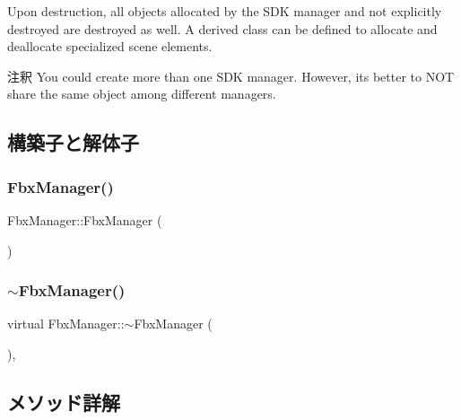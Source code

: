 Upon destruction, all objects allocated by the S\+DK manager and not explicitly destroyed are destroyed as well. A derived class can be defined to allocate and deallocate specialized scene elements. \begin{DoxyRemark}{注釈}
You could create more than one S\+DK manager. However, it\textquotesingle{}s better to N\+OT share the same object among different managers. 
\end{DoxyRemark}


\subsection{構築子と解体子}
\mbox{\label{class_fbx_manager_ab7b188ec0c92172140883e2be38e1a4a}} 
\subsubsection{\texorpdfstring{Fbx\+Manager()}{FbxManager()}}
{\footnotesize\ttfamily Fbx\+Manager\+::\+Fbx\+Manager (\begin{DoxyParamCaption}{ }\end{DoxyParamCaption})\hspace{0.3cm}{\ttfamily [protected]}}

\mbox{\label{class_fbx_manager_a37045bda50435f908719b9e45b79ddbd}} 
\subsubsection{\texorpdfstring{$\sim$\+Fbx\+Manager()}{~FbxManager()}}
{\footnotesize\ttfamily virtual Fbx\+Manager\+::$\sim$\+Fbx\+Manager (\begin{DoxyParamCaption}{ }\end{DoxyParamCaption})\hspace{0.3cm}{\ttfamily [protected]}, {\ttfamily [virtual]}}



\subsection{メソッド詳解}
\mbox{\label{class_fbx_manager_adf2f27440cd29bed880f944a0f83831b}} 

